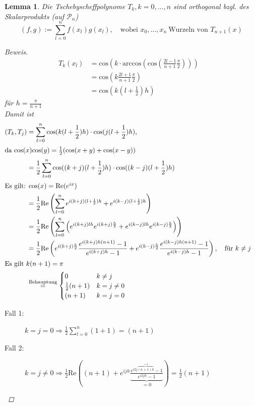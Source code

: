 \documentclass[12pt]{article}
\theoremstyle{break}
\newtheorem{lemma}[theorem]{Lemma}
\begin{document}
\begin{lemma}
Die Tschebyscheffpolynome $T_k, k = 0, ..., n$ sind orthogonal bzgl. des Skalarprodukts (auf $\mathcal{P}_n$)
\[(f, g) := \sum_{l=0}^n f(x_l)g(x_l), \quad \text{wobei } x_0, ..., x_n \medspace \text{Wurzeln von } T_{n+1}(x) \]

\begin{proof}[Beweis]\leavevmode
\begin{align*}
T_k(x_l) &= \text{cos}(k \cdot \text{arccos}( \text{cos} ( \frac{2l-1}{n+1} \frac{\pi}{2}))) &\\
&= \text{cos}( k \frac{2l+1}{n+1} \frac{\pi}{2}) &\\
&= \text{cos}(k (l+ \frac{1}{2})h )
\end{align*}
für $h = \frac{\pi}{n+1}$\\
Damit ist 
\begin{align*}
(T_k, T_j) &= \sum_{l=0}^n \text{cos}(k(l+\frac{1}{2})h) \cdot \text{cos}(j(l+\frac{1}{2})h), &\\
\intertext{da $\text{cos}(x)\text{cos}(y) = \frac{1}{2}(\text{cos}(x+y) + \text{cos}(x-y))$}
&= \frac{1}{2} \sum_{l=0}^n \text{cos}((k+j)(l+\frac{1}{2})h) \cdot \text{cos}((k-j)(l+\frac{1}{2})h) &\\
\intertext{Es gilt: $\text{cos}(x) = \text{Re} (e^{ix})$}
&= \frac{1}{2} \text{Re}\left( \sum_{l=0}^n e^{i(k+j)(l+\frac{1}{2})h} + e^{i(k-j)(l+\frac{1}{2})h}\right) &\\
&= \frac{1}{2} \text{Re}\left( \sum_{l=0}^n \left( e^{i(k+j)lh}e^{i(k+j)\frac{h}{2}} + e^{i(k-j)lh}e^{i(k-j)\frac{h}{2}}\right)\right) &\\
&= \frac{1}{2} \text{Re} \left( e^{i(k+j)\frac{h}{2}} \frac{e^{i(k+j)h(n+1)} -1}{ e^{i(k+j)h} - 1} + e^{i(k-j)\frac{h}{2}} \frac{e^{i(k-j)h(n+1)} -1}{ e^{i(k-j)h} - 1}\right), \quad \text{für }k \neq j &\\
\intertext{Es gilt $k(n+1) = \pi$}
&\overset{\text{Behauptung}}{=} \begin{cases}
0 & k \neq j \\
\frac{1}{2} (n+1) & k=j\neq 0 \\
(n+1) & k = j = 0
\end{cases}
\end{align*}
\begin{description}
  \item[Fall 1:] $k=j=0 \Rightarrow \frac{1}{2} \sum_{l=0}^n(1+1) = (n+1)$
  \item[Fall 2:] $k=j\neq0 \Rightarrow \frac{1}{2} \text{Re} \left( (n+1) + e^{ijh} \underbrace{\frac{e^{i2j\overbrace{(n+1)h}^{= \pi}}-1}{e^{i2jh}-1}}_{=0}\right) = \frac{1}{2} (n+1)$ 

\end{description}
\end{proof}
\end{lemma}
\end{document}
